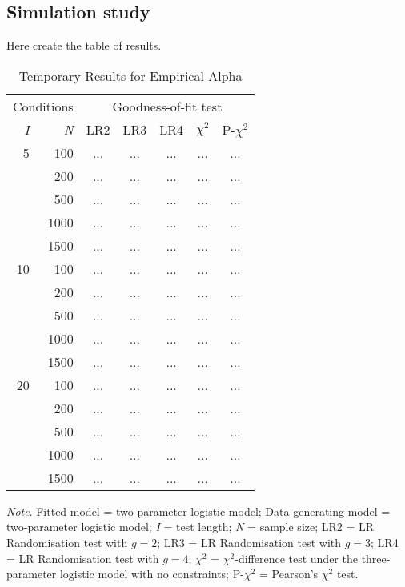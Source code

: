 \documentclass[Royal,sageapa,times,doublespace]{sagej}
\begin{document}
\subsection{Simulation study}

Here create the table of results.
\begin{table}[t!]
\caption{Temporary Results for Empirical Alpha}
\begin{tabular}{ r r | c c c c c }
\toprule
\multicolumn{2}{c}{Conditions} & \multicolumn{5}{c}{Goodness-of-fit test} \\
\textit{I} & \textit{N} & LR2 & LR3 & LR4 & $\chi^2$ & P-$\chi^2$ \\
\midrule
5 & 100 & ... & ... & ... & ... & ... \\ 
& 200 & ... & ... & ... & ... & ... \\
& 500 & ... & ... & ... & ... & ... \\
& 1000 & ... & ... & ... & ... & ... \\
& 1500 & ... & ... & ... & ... & ... \\
10 & 100 & ... & ... & ... & ... & ... \\ 
& 200 & ... & ... & ... & ... & ... \\
& 500 & ... & ... & ... & ... & ... \\
& 1000 & ... & ... & ... & ... & ... \\
& 1500 & ... & ... & ... & ... & ... \\
20 & 100 & ... & ... & ... & ... & ... \\ 
& 200 & ... & ... & ... & ... & ... \\
& 500 & ... & ... & ... & ... & ... \\
& 1000 & ... & ... & ... & ... & ... \\
& 1500 & ... & ... & ... & ... & ... \\
\bottomrule
\end{tabular}

\bigskip
\small\textit{Note}. Fitted model = two-parameter logistic model; Data generating model = two-parameter logistic model; \textit{I} = test length; \textit{N} = sample size; LR2 = LR Randomisation test with $g = 2$; LR3 = LR Randomisation test with $g = 3$; LR4 = LR Randomisation test with $g = 4$; $\chi^2$ = $\chi^2$-difference test under the three-parameter logistic model with no constraints; P-$\chi^2$ = Pearson's $\chi^2$ test.
\label{tab:2}
\end{table}
\end{document}
